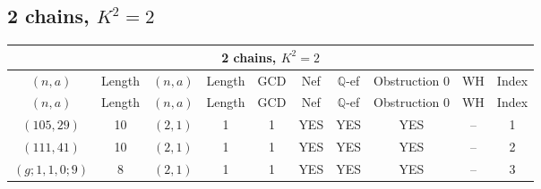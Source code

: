 \subsection{2 chains, \(K^2 = 2\)}
\begin{longtable}{|c|c|c|c|c|c|c|c|c|c|}
\hline
\multicolumn{10}{|c|}{2 chains, $K^2 = 2$}\\
\hline
$(n,a)$ & Length & $(n,a)$ & Length & GCD & Nef & $\mathbb Q$-ef & Obstruction 0 & WH & Index\\
\hline
\endfirsthead

\hline
$(n,a)$ & Length & $(n,a)$ & Length & GCD & Nef & $\mathbb Q$-ef & Obstruction 0 & WH & Index\\
\hline
\endhead
\hline
\endfoot

$(105, 29)$ & 10 & $(2, 1)$ & 1 & 1 & YES & YES & YES & -- & 1\\
$(111, 41)$ & 10 & $(2, 1)$ & 1 & 1 & YES & YES & YES & -- & 2\\
$(g; 1, 1, 0; 9)$ & 8 & $(2, 1)$ & 1 & 1 & YES & YES & YES & -- & 3
\end{longtable}
